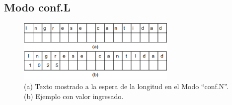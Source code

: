 \documentclass[main_conf.tex]{subfiles}
\begin{document}
\subsection{Modo conf.L}

\begin{figure}[!t]
  \centering
  \includegraphics[width=3.0in]{../img/Modo_Conf_N.png}
  \caption{(a) Texto mostrado a la espera de la longitud en el Modo “conf.N”.
           (b) Ejemplo con valor ingresado.
  }
  \label{Modo_Conf_N}
\end{figure}
\end{document}

